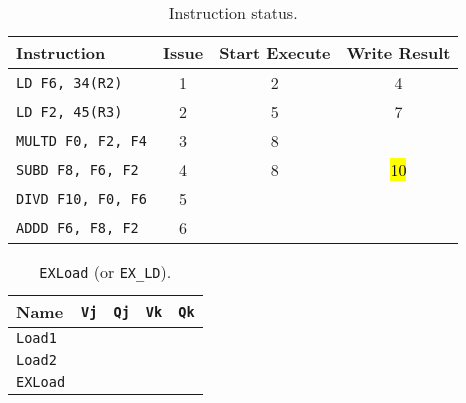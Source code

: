 \begin{enumerate}
    \begin{table}[!htp]
        \centering
        \begin{tabular}{@{} l | c c c @{}}
            \toprule
            Instruction                 & Issue & Start Execute & Write Result  \\
            \midrule
            \texttt{LD    F6, 34(R2)}   & 1     & 2             & 4             \\ [.3em]
            \texttt{LD    F2, 45(R3)}   & 2     & 5             & 7             \\ [.3em]
            \texttt{MULTD F0, F2, F4}   & 3     & 8             &               \\ [.3em]
            \texttt{SUBD  F8, F6, F2}   & 4     & 8             & \hl{10}       \\ [.3em]
            \texttt{DIVD  F10, F0, F6}  & 5     &               &               \\ [.3em]
            \texttt{ADDD  F6, F8, F2}   & 6     &               &               \\
            \bottomrule
        \end{tabular}
        \caption*{Instruction status.}
    \end{table}

    \begin{table}[!htp]
        \centering
        \begin{tabular}{@{} l | c c c c @{}}
            \toprule
            Name            & \texttt{Vj}   & \texttt{Qj}   & \texttt{Vk}           & \texttt{Qk}   \\
            \midrule
            \texttt{Load1}  &               &               &                       &               \\ [.3em]
            \texttt{Load2}  &               &               &                       &               \\
            \cmidrule{1-5}
            \texttt{EXLoad} &               &               &                       &               \\
            \bottomrule
        \end{tabular}
        \caption*{\texttt{EXLoad} (or \texttt{EX\_LD}).}
    \end{table}


\end{enumerate}
